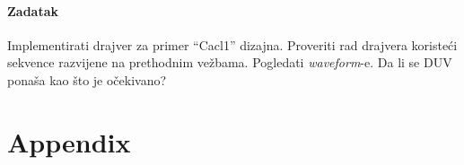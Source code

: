 \paragraph{Zadatak}

Implementirati drajver za primer ``Cacl1'' dizajna. Proveriti rad drajvera
koristeći sekvence razvijene na prethodnim vežbama. Pogledati \emph{waveform}-e.
Da li se DUV ponaša kao što je očekivano?


\section{Appendix}

















